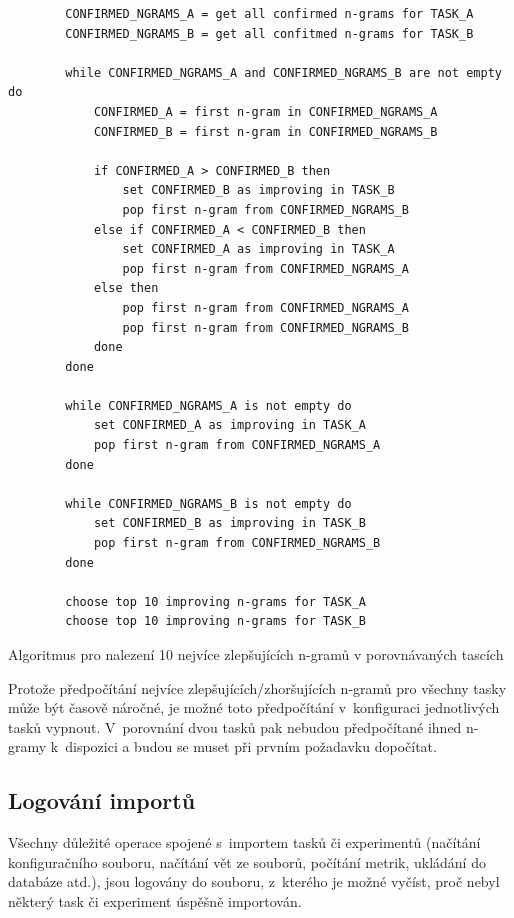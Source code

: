 \begin{algorithm}
	\begin{verbatim}
		CONFIRMED_NGRAMS_A = get all confirmed n-grams for TASK_A
		CONFIRMED_NGRAMS_B = get all confitmed n-grams for TASK_B

		while CONFIRMED_NGRAMS_A and CONFIRMED_NGRAMS_B are not empty do
		    CONFIRMED_A = first n-gram in CONFIRMED_NGRAMS_A
		    CONFIRMED_B = first n-gram in CONFIRMED_NGRAMS_B

		    if CONFIRMED_A > CONFIRMED_B then
		        set CONFIRMED_B as improving in TASK_B
		        pop first n-gram from CONFIRMED_NGRAMS_B
		    else if CONFIRMED_A < CONFIRMED_B then
		        set CONFIRMED_A as improving in TASK_A
		        pop first n-gram from CONFIRMED_NGRAMS_A
		    else then
		        pop first n-gram from CONFIRMED_NGRAMS_A
		        pop first n-gram from CONFIRMED_NGRAMS_B
		    done
		done

		while CONFIRMED_NGRAMS_A is not empty do
		    set CONFIRMED_A as improving in TASK_A
		    pop first n-gram from CONFIRMED_NGRAMS_A
		done

		while CONFIRMED_NGRAMS_B is not empty do
		    set CONFIRMED_B as improving in TASK_B
		    pop first n-gram from CONFIRMED_NGRAMS_B
		done

		choose top 10 improving n-grams for TASK_A
		choose top 10 improving n-grams for TASK_B
	\end{verbatim}

	\caption{Algoritmus pro nalezení 10 nejvíce zlepšujících \mbox{n-gramů} v porovnávaných tascích}
	\label{alg:improving}
\end{algorithm}



Protože předpočítání nejvíce zlepšujících/zhoršujících n-gramů pro všechny tasky může být časově náročné,
  je možné toto předpočítání v~konfiguraci jednotlivých tasků vypnout.
V~porovnání dvou tasků pak nebudou předpočítané ihned \mbox{n-gramy} k~dispozici
  a budou se muset při prvním požadavku dopočítat. 

\subsection{Logování importů}
Všechny důležité operace spojené s~importem tasků či experimentů
  (načítání konfiguračního souboru, načítání vět ze souborů,
  počítání metrik, ukládání do databáze atd.), 
  jsou logovány do souboru,
  z~kterého je možné vyčíst,
  proč nebyl některý task či experiment úspěšně importován. 


